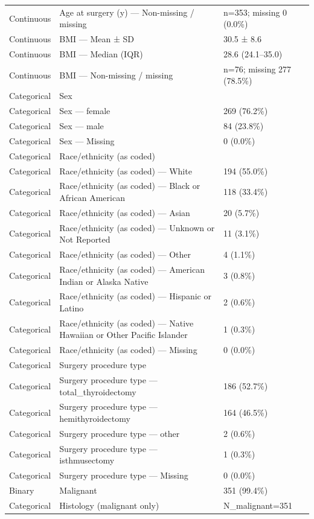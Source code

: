 \begin{table}[htbp]
\begin{tabular}{lll}
Continuous & Age at surgery (y) — Non-missing / missing & n=353; missing 0 (0.0\%) \\
Continuous & BMI — Mean ± SD & 30.5 ± 8.6 \\
Continuous & BMI — Median (IQR) & 28.6 (24.1–35.0) \\
Continuous & BMI — Non-missing / missing & n=76; missing 277 (78.5\%) \\
Categorical & Sex &  \\
Categorical & Sex — female & 269 (76.2\%) \\
Categorical & Sex — male & 84 (23.8\%) \\
Categorical & Sex — Missing & 0 (0.0\%) \\
Categorical & Race/ethnicity (as coded) &  \\
Categorical & Race/ethnicity (as coded) — White & 194 (55.0\%) \\
Categorical & Race/ethnicity (as coded) — Black or African American & 118 (33.4\%) \\
Categorical & Race/ethnicity (as coded) — Asian & 20 (5.7\%) \\
Categorical & Race/ethnicity (as coded) — Unknown or Not Reported & 11 (3.1\%) \\
Categorical & Race/ethnicity (as coded) — Other & 4 (1.1\%) \\
Categorical & Race/ethnicity (as coded) — American Indian or Alaska Native & 3 (0.8\%) \\
Categorical & Race/ethnicity (as coded) — Hispanic or Latino & 2 (0.6\%) \\
Categorical & Race/ethnicity (as coded) — Native Hawaiian or Other Pacific Islander & 1 (0.3\%) \\
Categorical & Race/ethnicity (as coded) — Missing & 0 (0.0\%) \\
Categorical & Surgery procedure type &  \\
Categorical & Surgery procedure type — total\_thyroidectomy & 186 (52.7\%) \\
Categorical & Surgery procedure type — hemithyroidectomy & 164 (46.5\%) \\
Categorical & Surgery procedure type — other & 2 (0.6\%) \\
Categorical & Surgery procedure type — isthmusectomy & 1 (0.3\%) \\
Categorical & Surgery procedure type — Missing & 0 (0.0\%) \\
Binary & Malignant & 351 (99.4\%) \\
Categorical & Histology (malignant only) & N\_malignant=351 \\

\end{tabular}
\end{table}
